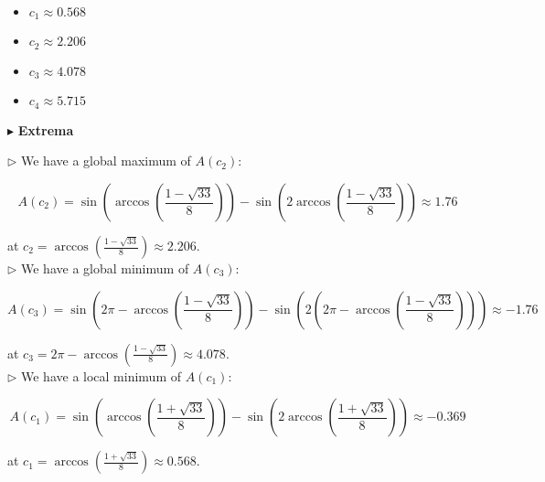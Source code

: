 \documentclass{ximera}
\begin{document}
\begin{center}
\end{center}




\begin{itemize}
  \item $c_1 \approx 0.568$
  \item $c_2 \approx 2.206$
  \item $c_3 \approx 4.078$
  \item $c_4 \approx 5.715$
\end{itemize}







$\blacktriangleright$ \textbf{Extrema}




$\rhd$ We have a global maximum of $A(c_2)$:


\[  A(c_2) = \sin\left(\arccos\left(\frac{1 - \sqrt{33}}{8}\right)\right) - \sin\left(2 \arccos\left(\frac{1 - \sqrt{33}}{8}\right)\right) \approx 1.76   \]




at $c_2 = \arccos\left(\frac{1 - \sqrt{33}}{8}\right) \approx 2.206$. \\









$\rhd$ We have a global minimum of $A(c_3)$:


\[  A(c_3) = \sin\left(   2\pi - \arccos\left(\frac{1 - \sqrt{33}}{8}\right)    \right) - \sin\left(2  \left(     2\pi - \arccos\left(\frac{1 - \sqrt{33}}{8}\right)     \right) \right)  \approx -1.76  \]




at $c_3 = 2\pi - \arccos\left(\frac{1 - \sqrt{33}}{8}\right) \approx 4.078$. \\








$\rhd$ We have a local minimum of $A(c_1)$:


\[  A(c_1) = \sin\left(   \arccos\left(\frac{1 + \sqrt{33}}{8}\right)    \right) - \sin\left(2  \arccos\left(\frac{1 + \sqrt{33}}{8}\right)   \right)  \approx -0.369  \]




at $c_1 = \arccos\left(\frac{1 + \sqrt{33}}{8}\right) \approx 0.568$.   \\
\end{document}
